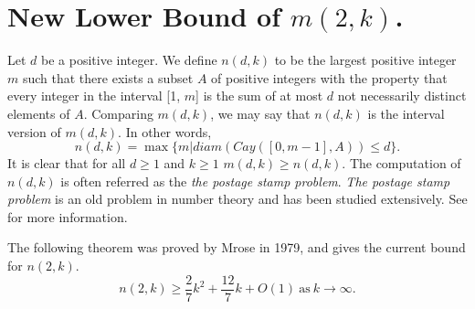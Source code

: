 \section{ New Lower Bound of $m(2, k)$.}
Let $d$ be a positive integer. We define $n(d, k)$ to be the largest positive integer $m$ such that there exists a subset $A$ of positive integers with the property that every integer in the interval [1, $m$] is the sum of at most $d$ not necessarily distinct elements of $A$. Comparing $m(d, k)$, we may say that $n(d, k)$ is the interval version of $m(d, k)$. In other words, 
\[
n(d, k) = \max\{m | diam(Cay([0, m - 1], A)) \leq d\}.
\]
It is clear that for all $d \geq 1$ and $k \geq 1$ $m(d, k) \geq n(d, k)$. The computation of  $n(d, k)$ is often referred as the \emph{the postage stamp problem}. \emph{The postage stamp problem} is an old problem in number theory and has been studied extensively. See  for more information. 

The following theorem was proved by Mrose in 1979, and gives the current bound for $n(2, k)$.
\[
n(2, k) \geq \frac{2}{7}k^2 + \frac{12}{7}k + O(1)\  \text{as} \  k \to \infty.
\]

